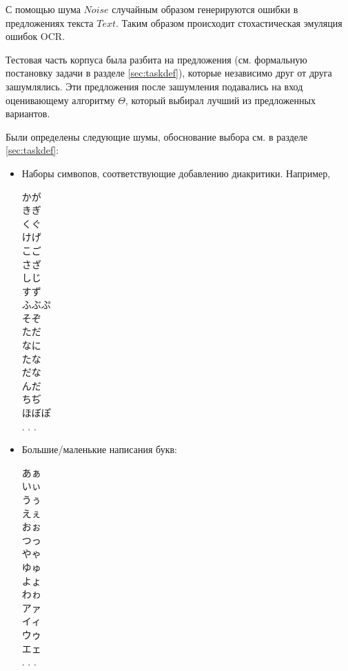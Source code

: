 С помощью шума $Noise$ случайным образом генерируются ошибки в предложениях текста $Text$. Таким образом происходит стохастическая эмуляция ошибок OCR. 

Тестовая часть корпуса была разбита на предложения (см. формальную постановку задачи в разделе \cref{sec:taskdef}), которые независимо друг от друга зашумлялись. Эти предложения после зашумления подавались на вход оценивающему алгоритму $\Theta$, который выбирал лучший из предложенных вариантов.

Были определены следующие шумы, обоснование выбора см. в разделе \cref{sec:taskdef}: 

\begin{itemize}
	\item[\KG] Наборы симвопов, соответствующие добавлению диакритики. Например,
	
	\begin{multicols}{3}
		\begin{CJK}{UTF8}{min}
			かが \\
			きぎ \\
			くぐ \\
			けげ \\
			こご \\
			さざ \\
			しじ \\
			すず \\
			ふぶぷ   \\
			そぞ \\
			ただ \\
			なに \\
			たな \\
			だな \\
			んだ \\
			ちぢ \\
		ほぼぽ \\
	. . .\end{CJK}
	\end{multicols}


	\item[\BS] Большие/маленькие написания букв:
	
	\begin{multicols}{3}
	\begin{CJK}{UTF8}{min}
		あぁ \\
		いぃ\\
		うぅ\\
		えぇ\\
		おぉ\\
		つっ\\
		やゃ\\
		ゆゅ\\
		よょ\\
		わゎ\\
		アァ\\
		イィ\\
		ウゥ\\
		エェ\\
		. . . \end{CJK}
\end{multicols}


\end{itemize}
